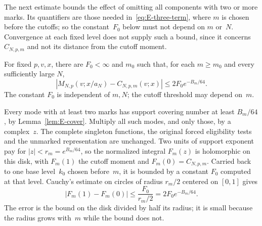 The next estimate bounds the effect of omitting all components with two or more marks. Its quantifiers are those needed in~\eqref{eq:E-three-term}, where $m$ is chosen before the cutoffs; so the constant~$F_0$ below must not depend on $m$ or~$N$. Convergence at each fixed level does not supply such a bound, since it concerns $C_{N,p,m}$ and not its distance from the cutoff moment.
\begin{lemma}\label{lem:E-stopping}
For fixed $p,v,x$, there are $F_0<\infty$ and $m_0$ such that, for each $m\ge m_0$ and every sufficiently large $N$,
\begin{equation}\label{eq:E-stop-error}
 |M_{N,p}(v;x/a_N)-C_{N,p,m}(v;x)|
 \le2F_0e^{-B_m/64}.
\end{equation}
The constant $F_0$ is independent of $m,N$; the cutoff threshold may depend on~$m$.
\end{lemma}
Every mode with at least two marks has support covering number at least $B_m/64$, by Lemma~\ref{lem:E-cover}. Multiply all such modes, and only those, by a complex~$z$. The complete singleton functions, the original forced eligibility tests and the unmarked representation are unchanged. Two units of support exponent pay for $|z|<r_m=e^{B_m/64}$, so the normalized integral $F_m(z)$ is holomorphic on this disk, with $F_m(1)$ the cutoff moment and $F_m(0)=C_{N,p,m}$. Carried back to one base level~$k_0$ chosen before~$m$, it is bounded by a constant $F_0$ computed at that level. Cauchy's estimate on circles of radius $r_m/2$ centered on $[0,1]$ gives
\begin{equation*}
 |F_m(1)-F_m(0)|\le\frac{F_0}{r_m/2}=2F_0e^{-B_m/64}.
\end{equation*}
The error is the bound on the disk divided by half its radius; it is small because the radius grows with~$m$ while the bound does not.
